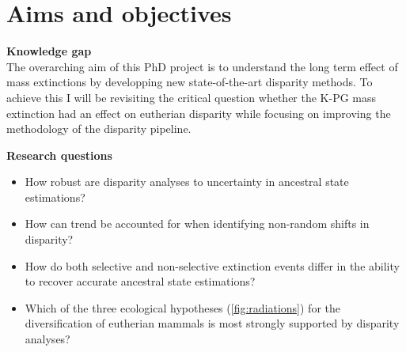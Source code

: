 \documentclass[titlepage]{article}
\begin{document}
\section{Aims and objectives}
\textbf{Knowledge gap} \\
The overarching aim of this PhD project is to understand the long term effect of mass extinctions by developping new state-of-the-art disparity methods. 
To achieve this I will be revisiting the critical question whether the K-PG mass extinction had an effect on eutherian disparity while focusing on improving the methodology of the disparity pipeline.

\noindent\textbf{Research questions}
\begin{itemize}
    \item How robust are disparity analyses to uncertainty in ancestral state estimations?
    \item How can trend be accounted for when identifying non-random shifts in disparity?
    \item How do both selective and non-selective extinction events differ in the ability to recover accurate ancestral state estimations?
    \item Which of the three ecological hypotheses (\autoref{fig:radiations}) for the diversification of eutherian mammals is most strongly supported by disparity analyses?
\end{itemize}
\end{document}
